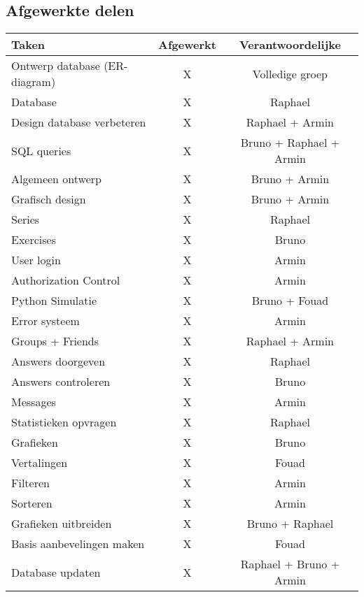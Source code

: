 \subsection{Afgewerkte delen}
\begin{tabular}{| l | c | c |}
    \hline
    Taken   &   Afgewerkt   &   Verantwoordelijke \\
    \hline \hline
    Ontwerp database (ER-diagram)   &   X   &   Volledige groep \\
    Database                &   X   &   Raphael \\
    Design database verbeteren  &   X   &   Raphael + Armin \\
    SQL queries             &   X   &   Bruno + Raphael + Armin \\
    Algemeen ontwerp        &   X   &   Bruno + Armin   \\
    Grafisch design         &   X   &   Bruno + Armin  \\
    Series                  &   X   &   Raphael \\
    Exercises               &   X   &   Bruno   \\
    User login              &   X   &   Armin   \\
    Authorization Control   &   X   &   Armin   \\
    Python Simulatie        &   X   &   Bruno + Fouad   \\
    Error systeem           &   X   &   Armin \\
    Groups + Friends        &   X   &   Raphael + Armin    \\
    Answers doorgeven       &   X   &   Raphael \\
    Answers controleren     &   X   &   Bruno   \\
    Messages                &   X   &   Armin   \\
    Statistieken opvragen   &   X   &   Raphael \\
    Grafieken               &   X   &   Bruno   \\
    Vertalingen             &   X   &   Fouad   \\
    Filteren                &   X   &   Armin   \\
    Sorteren                &   X   &   Armin   \\
    Grafieken uitbreiden    &   X   &   Bruno + Raphael \\
    Basis aanbevelingen maken &   X   & Fouad \\
    Database updaten        &   X   &   Raphael + Bruno + Armin \\

\end{tabular}
